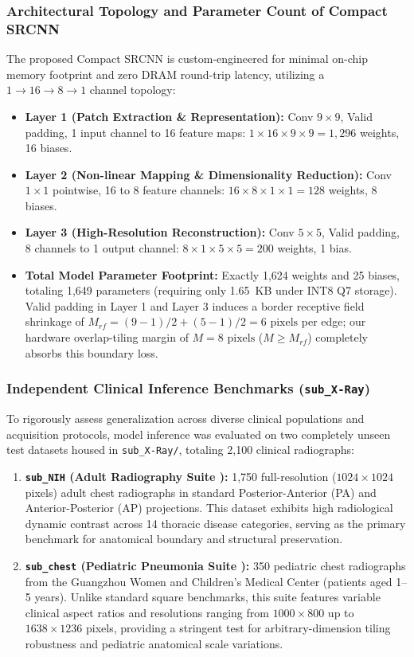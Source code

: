 \documentclass[conference]{IEEEtran}
\begin{document}
\subsubsection{Architectural Topology and Parameter Count of Compact SRCNN}
The proposed Compact SRCNN is custom-engineered for minimal on-chip memory footprint and zero DRAM round-trip latency, utilizing a $1 \rightarrow 16 \rightarrow 8 \rightarrow 1$ channel topology:
\begin{itemize}
    \item \textbf{Layer 1 (Patch Extraction \& Representation):} Conv $9 \times 9$, Valid padding, 1 input channel to 16 feature maps: $1 \times 16 \times 9 \times 9 = 1,296$ weights, 16 biases.
    \item \textbf{Layer 2 (Non-linear Mapping \& Dimensionality Reduction):} Conv $1 \times 1$ pointwise, 16 to 8 feature channels: $16 \times 8 \times 1 \times 1 = 128$ weights, 8 biases.
    \item \textbf{Layer 3 (High-Resolution Reconstruction):} Conv $5 \times 5$, Valid padding, 8 channels to 1 output channel: $8 \times 1 \times 5 \times 5 = 200$ weights, 1 bias.
    \item \textbf{Total Model Parameter Footprint:} Exactly 1,624 weights and 25 biases, totaling 1,649 parameters (requiring only 1.65~KB under INT8 Q7 storage). Valid padding in Layer 1 and Layer 3 induces a border receptive field shrinkage of $M_{rf} = (9-1)/2 + (5-1)/2 = 6\text{ pixels}$ per edge; our hardware overlap-tiling margin of $M = 8\text{ pixels}$ ($M \ge M_{rf}$) completely absorbs this boundary loss.
\end{itemize}

\subsubsection{Independent Clinical Inference Benchmarks (\texttt{sub\_X-Ray})}
To rigorously assess generalization across diverse clinical populations and acquisition protocols, model inference was evaluated on two completely unseen test datasets housed in \texttt{sub\_X-Ray/}, totaling 2,100 clinical radiographs:
\begin{enumerate}
    \item \textbf{\texttt{sub\_NIH} (Adult Radiography Suite \cite{wang2017chestxray}):} 1,750 full-resolution ($1024 \times 1024$ pixels) adult chest radiographs in standard Posterior-Anterior (PA) and Anterior-Posterior (AP) projections. This dataset exhibits high radiological dynamic contrast across 14 thoracic disease categories, serving as the primary benchmark for anatomical boundary and structural preservation.
    \item \textbf{\texttt{sub\_chest} (Pediatric Pneumonia Suite \cite{kermany2018identifying}):} 350 pediatric chest radiographs from the Guangzhou Women and Children's Medical Center (patients aged 1--5 years). Unlike standard square benchmarks, this suite features variable clinical aspect ratios and resolutions ranging from $1000 \times 800$ up to $1638 \times 1236$ pixels, providing a stringent test for arbitrary-dimension tiling robustness and pediatric anatomical scale variations.
\end{enumerate}
\end{document}
